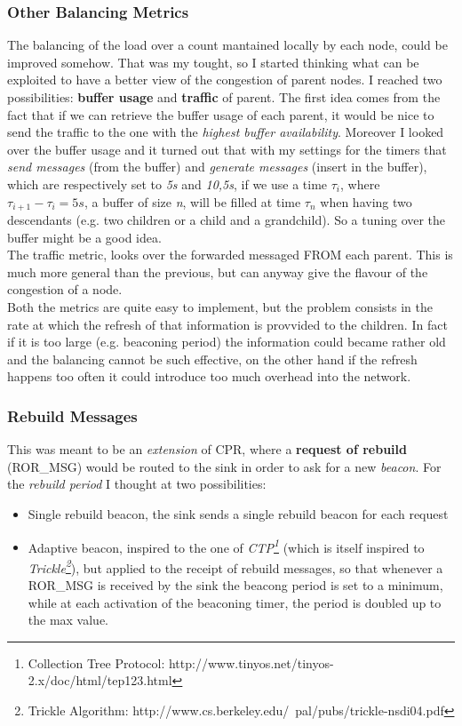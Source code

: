 \documentclass{article}
\begin{document}
		\subsubsection{Other Balancing Metrics}
		\label{sec:balancingMetrics}
The balancing of the load over a count mantained locally by each node, could be improved somehow. That was my tought, so I started thinking what can be exploited to have a better view of the congestion of parent nodes. I reached two possibilities: \textbf{buffer usage} and \textbf{traffic} of parent. The first idea comes from the fact that if we can retrieve the buffer usage of each parent, it would be nice to send the traffic to the one with the \emph{highest buffer availability}. Moreover I looked over the buffer usage and it turned out that with my settings for the timers that \emph{send messages} (from the buffer) and \emph{generate messages} (insert in the buffer), which are respectively set to \textit{5s} and \textit{10,5s}, if we use a time $\tau_i$, where $\tau_{i+1}-\tau_{i}=5s$, a buffer of size \emph{n}, will be filled at time $\tau_n$ when having two descendants (e.g. two children or a child and a grandchild). So a tuning over the buffer might be a good idea.
\\ The traffic metric, looks over the forwarded messaged FROM each parent. This is much more general than the previous, but can anyway give the flavour of the congestion of a node.
\\Both the metrics are quite easy to implement, but the problem consists in the rate at which the refresh of that information is provvided to the children. In fact if it is too large (e.g. beaconing period) the information could became rather old and the balancing cannot be such effective, on the other hand if the refresh happens too often it could introduce too much overhead into the network.

		\subsubsection{Rebuild Messages}

This was meant to be an \textit{extension} of CPR, where a \textbf{request of rebuild} (ROR\_MSG) would be routed to the sink in order to ask for a new \emph{beacon}. For the \textit{rebuild period} I thought at two possibilities:
			\begin{itemize}
				\item Single rebuild beacon, the sink sends a single rebuild beacon for each request
				\item Adaptive beacon, inspired to the one of \emph{CTP\footnote{Collection Tree Protocol: http://www.tinyos.net/tinyos-2.x/doc/html/tep123.html}} (which is itself inspired to \emph{Trickle\footnote{Trickle Algorithm: http://www.cs.berkeley.edu/~pal/pubs/trickle-nsdi04.pdf}}), but applied to the receipt of rebuild messages, so that whenever a ROR\_MSG is received by the sink the beacong period is set to a minimum, while at each activation of the beaconing timer, the period is doubled up to the max value.
			\end{itemize}
		
\end{document}
